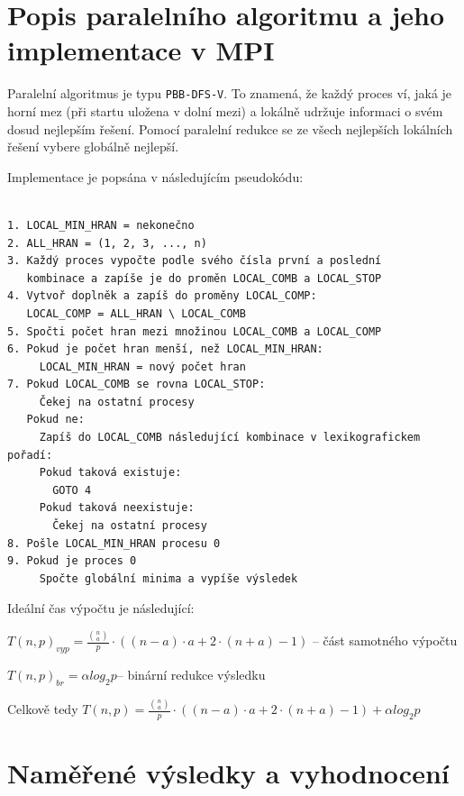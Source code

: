 \documentclass[12pt]{article}
\begin{document}
\section{Popis paralelního algoritmu a jeho implementace v MPI}

Paralelní algoritmus je typu \texttt{PBB-DFS-V}. To znamená, že každý proces ví, jaká je horní mez (při startu uložena v dolní mezi) a lokálně udržuje informaci o svém dosud nejlepším řešení. Pomocí paralelní redukce se ze všech nejlepších lokálních řešení vybere globálně nejlepší.

Implementace je popsána v následujícím pseudokódu:

\begin{verbatim}

1. LOCAL_MIN_HRAN = nekonečno
2. ALL_HRAN = (1, 2, 3, ..., n)
3. Každý proces vypočte podle svého čísla první a poslední 
   kombinace a zapíše je do proměn LOCAL_COMB a LOCAL_STOP
4. Vytvoř doplněk a zapíš do proměny LOCAL_COMP: 
   LOCAL_COMP = ALL_HRAN \ LOCAL_COMB
5. Spočti počet hran mezi množinou LOCAL_COMB a LOCAL_COMP
6. Pokud je počet hran menší, než LOCAL_MIN_HRAN:
     LOCAL_MIN_HRAN = nový počet hran
7. Pokud LOCAL_COMB se rovna LOCAL_STOP:
     Čekej na ostatní procesy
   Pokud ne:
     Zapíš do LOCAL_COMB následující kombinace v lexikografickem pořadí: 
     Pokud taková existuje:
       GOTO 4
     Pokud taková neexistuje:
       Čekej na ostatní procesy
8. Pošle LOCAL_MIN_HRAN procesu 0
9. Pokud je proces 0
     Spočte globální minima a vypíše výsledek

\end{verbatim}

Ideální čas výpočtu je následující:

\hspace{1cm}

$T(n,p)_{vyp} = \frac{{n \choose a}}{p}\cdot ((n - a) \cdot a + 2 \cdot (n + a) - 1)$ -- část samotného výpočtu

\hspace{1cm}

$T(n,p)_{br} = \alpha log_{2}p$-- binární redukce výsledku

\hspace{1cm}

Celkově tedy $T(n,p) = \frac{{n \choose a}}{p}\cdot ((n - a) \cdot a + 2 \cdot (n + a) - 1) + \alpha log_{2}p$

\section{Naměřené výsledky a vyhodnocení}
\end{document}
